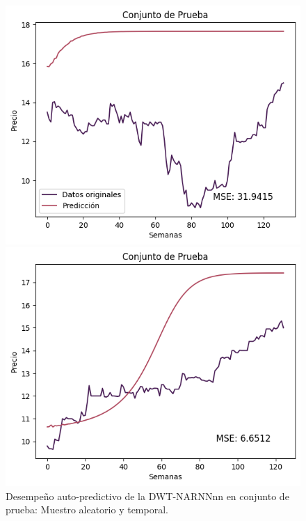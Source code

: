 \begin{figure}[H]
    \begin{minipage}{0.5\textwidth}
        \centering
        \includegraphics[width=\linewidth]{Figuras/proceso_de_entrenamiento/grafs_c_prueba/muestreo_aleatorio/DWT_NARNN/auto_predictiva/DWT_NARNN_rec.png}
    \end{minipage}
    \begin{minipage}{0.5\textwidth}
        \centering
        \includegraphics[width=\linewidth]{Figuras/proceso_de_entrenamiento/grafs_c_prueba/DWT_NARNN/auto_predictiva/DWT_NARNN_rec.png}
    \end{minipage}
    \caption{Desempeño auto-predictivo de la DWT-NARNNnn en conjunto de prueba: Muestro aleatorio y temporal.} 
    \label{fig:c_prueba_DWTNARNN_autopred_v2}
\end{figure}
\newpage
